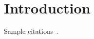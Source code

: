 
\section{Introduction}
\label{sec:intro}

Sample citations~\cite{libfuzz, honggfuzz, PZKJ17, Sere17}.

